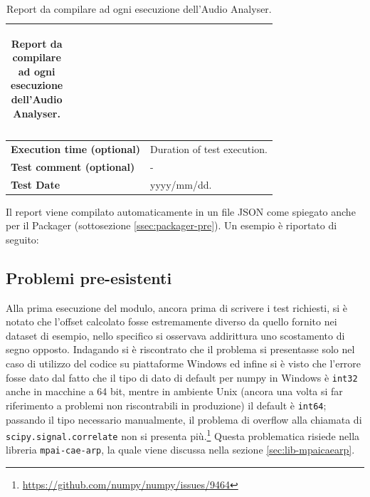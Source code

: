 \begin{spacing}{1.1}
\begin{table}[H]
\begin{tabularx}{\textwidth}{|p{}|X|}
\begin{adjustbox}{max width=0.65\textwidth}
\begin{tabular}{|c|c|c|}
                \hline
            \end{tabular} \end{adjustbox} \smallskip\\
            \hline
            \textbf{Execution time (optional)}                  &   Duration of test execution.\\
            \hline
            \textbf{Test comment (optional)}                    &   -\\
            \hline
            \textbf{Test Date}                                  &   yyyy/mm/dd.\\
            \hline
        \end{tabularx}
    \caption{Report da compilare ad ogni esecuzione dell'Audio Analyser.}
    \label{tab:audioanalyser-report}
\end{table}
\end{spacing}
Il report viene compilato automaticamente in un file JSON come spiegato anche per il Packager (sottosezione \ref{ssec:packager-pre}).
Un esempio è riportato di seguito:



\subsection{Problemi pre-esistenti} \label{ssec:audioanalyser-pre}  %
Alla prima esecuzione del modulo, ancora prima di scrivere i test richiesti, si è notato che l'offset calcolato fosse estremamente diverso da quello fornito nei dataset di esempio, nello specifico si osservava addirittura uno scostamento di segno opposto. Indagando si è riscontrato che il problema si presentasse solo nel caso di utilizzo del codice su piattaforme Windows ed infine si è visto che l'errore fosse dato dal fatto che il tipo di dato di default per numpy in Windows è \texttt{int32} anche in macchine a 64 bit, mentre in ambiente Unix (ancora una volta si far riferimento a problemi non riscontrabili in produzione) il default è \texttt{int64}; passando il tipo necessario manualmente, il problema di overflow alla chiamata di \texttt{scipy.signal.correlate} non si presenta più.\footnote{\url{https://github.com/numpy/numpy/issues/9464}}
Questa problematica risiede nella libreria \texttt{mpai-cae-arp}, la quale viene discussa nella sezione \ref{sec:lib-mpaicaearp}.   %

